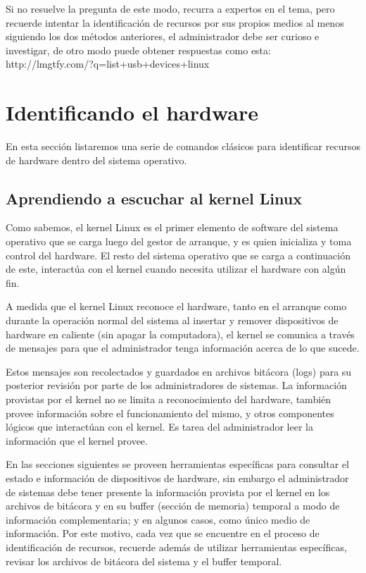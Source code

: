\documentclass[12pt]{article}
\begin{document}
Si no resuelve la pregunta de este modo, recurra a expertos en el tema, pero recuerde
intentar la identificación de recursos por sus propios medios al menos siguiendo los dos 
métodos anteriores, el administrador debe ser curioso e investigar, de otro modo puede 
obtener respuestas como esta: http://lmgtfy.com/?q=list+usb+devices+linux

\section*{Identificando el hardware}
En esta sección listaremos una serie de comandos clásicos para identificar recursos de
hardware dentro del sistema operativo. 

\subsection*{Aprendiendo a escuchar al kernel Linux}

Como sabemos, el kernel Linux es el primer elemento de software del sistema operativo 
que se carga luego del gestor de arranque, y es quien inicializa y toma control del hardware. 
El resto del sistema operativo que se carga a continuación de este, interactúa con el kernel 
cuando necesita utilizar el hardware con algún fin. 

A medida que el kernel Linux reconoce el hardware, tanto en el arranque como durante la 
operación normal del sistema al insertar y remover dispositivos de hardware 
en caliente (sin apagar la computadora), el kernel se comunica a través de mensajes para 
que el administrador tenga información acerca de lo que sucede. 

Estos mensajes son recolectados y guardados en archivos bitácora (logs) para su posterior 
revisión por parte de los administradores de sistemas. 
La información provistas por el kernel no se limita a reconocimiento del hardware, también 
provee información sobre el funcionamiento del mismo, y otros componentes lógicos que 
interactúan con el kernel. 
Es tarea del administrador leer la información que el kernel provee. 

En las secciones siguientes se proveen herramientas específicas para consultar el estado 
e información de dispositivos de hardware, sin embargo el administrador de sistemas debe
tener presente la información provista por el kernel en los archivos de bitácora y en su 
buffer (sección de memoria) temporal a modo de información complementaria; y en algunos 
casos, como único medio de información. Por este motivo, cada vez que se encuentre en el 
proceso de identificación de recursos, recuerde además de utilizar herramientas 
específicas, revisar los archivos de bitácora del sistema y el buffer temporal. 
\end{document}
